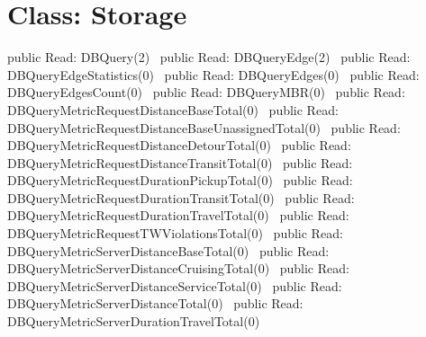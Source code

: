 \section*{Class: Storage}
\nwenddocs{}\endmoddef{}
public \LA{}Read: DBQuery(2)~{\nwtagstyle{}}\RA{}
public \LA{}Read: DBQueryEdge(2)~{\nwtagstyle{}}\RA{}
public \LA{}Read: DBQueryEdgeStatistics(0)~{\nwtagstyle{}}\RA{}
public \LA{}Read: DBQueryEdges(0)~{\nwtagstyle{}}\RA{}
public \LA{}Read: DBQueryEdgesCount(0)~{\nwtagstyle{}}\RA{}
public \LA{}Read: DBQueryMBR(0)~{\nwtagstyle{}}\RA{}
public \LA{}Read: DBQueryMetricRequestDistanceBaseTotal(0)~{\nwtagstyle{}}\RA{}
public \LA{}Read: DBQueryMetricRequestDistanceBaseUnassignedTotal(0)~{\nwtagstyle{}}\RA{}
public \LA{}Read: DBQueryMetricRequestDistanceDetourTotal(0)~{\nwtagstyle{}}\RA{}
public \LA{}Read: DBQueryMetricRequestDistanceTransitTotal(0)~{\nwtagstyle{}}\RA{}
public \LA{}Read: DBQueryMetricRequestDurationPickupTotal(0)~{\nwtagstyle{}}\RA{}
public \LA{}Read: DBQueryMetricRequestDurationTransitTotal(0)~{\nwtagstyle{}}\RA{}
public \LA{}Read: DBQueryMetricRequestDurationTravelTotal(0)~{\nwtagstyle{}}\RA{}
public \LA{}Read: DBQueryMetricRequestTWViolationsTotal(0)~{\nwtagstyle{}}\RA{}
public \LA{}Read: DBQueryMetricServerDistanceBaseTotal(0)~{\nwtagstyle{}}\RA{}
public \LA{}Read: DBQueryMetricServerDistanceCruisingTotal(0)~{\nwtagstyle{}}\RA{}
public \LA{}Read: DBQueryMetricServerDistanceServiceTotal(0)~{\nwtagstyle{}}\RA{}
public \LA{}Read: DBQueryMetricServerDistanceTotal(0)~{\nwtagstyle{}}\RA{}
public \LA{}Read: DBQueryMetricServerDurationTravelTotal(0)~{\nwtagstyle{}}\RA{}
